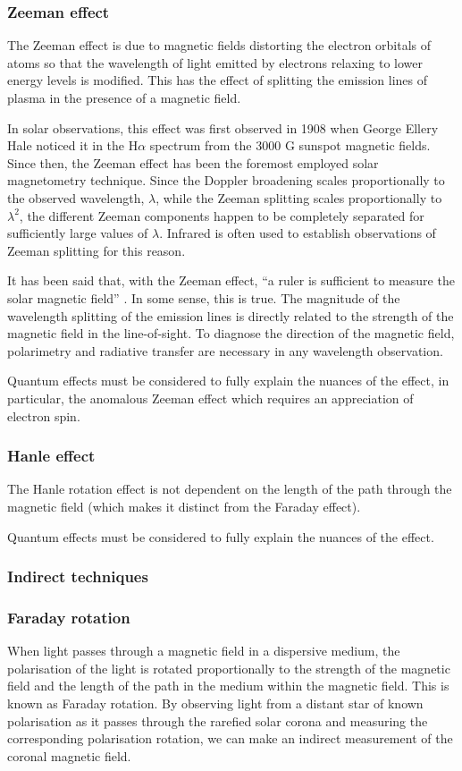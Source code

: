 \documentclass[12pt]{../style-files/ociamthesis}
\begin{document}
\subsubsection{Zeeman effect}
The Zeeman effect is due to magnetic fields distorting the electron orbitals of atoms so that the wavelength of light emitted by electrons relaxing to lower energy levels is modified. This has the effect of splitting the emission lines of plasma in the presence of a magnetic field.

In solar observations, this effect was first observed in 1908 when George Ellery Hale noticed it in the H$\alpha$ spectrum from the 3000 G sunspot magnetic fields. Since then, the Zeeman effect has been the foremost employed solar magnetometry  technique. Since the Doppler broadening scales proportionally to the observed wavelength, $\lambda$, while the Zeeman splitting scales proportionally to $\lambda^2$, the different Zeeman components happen to be completely separated for sufficiently large values of $\lambda$. Infrared is often used to establish observations of Zeeman splitting for this reason.

It has been said that, with the Zeeman effect, “a ruler is sufficient to measure the solar magnetic field” \citep{lan03}. In some sense, this is true. The magnitude of the wavelength splitting of the emission lines is directly related to the strength of the magnetic field in the line-of-sight. To diagnose the direction of the magnetic field, polarimetry and radiative transfer are necessary in any wavelength observation.

Quantum effects must be considered to fully explain the nuances of the effect, in particular, the anomalous Zeeman effect which requires an appreciation of electron spin.

\subsubsection{Hanle effect}
The Hanle rotation effect is not dependent on the length of the path through the magnetic field (which makes it distinct from the Faraday effect). 

Quantum effects must be considered to fully explain the nuances of the effect.

\subsubsection{Indirect techniques}
\subsubsection{Faraday rotation}
When light passes through a magnetic field in a dispersive medium, the polarisation of the light is rotated proportionally to the strength of the magnetic field and the length of the path in the medium within the magnetic field. This is known as Faraday rotation. By observing light from a distant star of known polarisation as it passes through the rarefied solar corona and measuring the corresponding polarisation rotation, we can make an indirect measurement of the coronal magnetic field.
\end{document}
